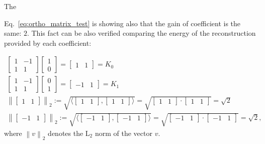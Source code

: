 The 

Eq.~\ref{eq:ortho_matrix_test} is showing also that the gain of
coefficient is the same: $2$. This fact can be also verified comparing
the energy of the reconstruction provided by each coefficient:

\begin{equation*}
  \begin{array}{l}
    \begin{bmatrix}
      1 & -1 \\
      1 & 1
    \end{bmatrix}
    \begin{bmatrix}
      1 \\
      0
    \end{bmatrix}
    =
    \begin{bmatrix}
      1 & 1
    \end{bmatrix} = K_0
    \\
    \begin{bmatrix}
      1 & -1 \\
      1 & 1
    \end{bmatrix}
    \begin{bmatrix}
      0 \\
      1
    \end{bmatrix}
    =
    \begin{bmatrix}
      -1 & 1
    \end{bmatrix} = K_1
    \\
    \left\| \begin{bmatrix}1 & 1\end{bmatrix} \right\|_2 := \sqrt{\langle \begin{bmatrix}1 & 1\end{bmatrix}, \begin{bmatrix}1 & 1\end{bmatrix} \rangle} = \sqrt{\begin{bmatrix}1 & 1\end{bmatrix}\cdot \begin{bmatrix}1 & 1\end{bmatrix}} = \sqrt{2}\\
    \left\| \begin{bmatrix}-1 & 1\end{bmatrix} \right\|_2 := \sqrt{\langle \begin{bmatrix}-1 & 1\end{bmatrix}, \begin{bmatrix}-1 & 1\end{bmatrix} \rangle} = \sqrt{\begin{bmatrix}-1 & 1\end{bmatrix}\cdot \begin{bmatrix}-1 & 1\end{bmatrix}} = \sqrt{2},
  \end{array}
\end{equation*}
where $\left\|v \right\|_2$ denotes the L$_2$ norm of the vector $v$.

